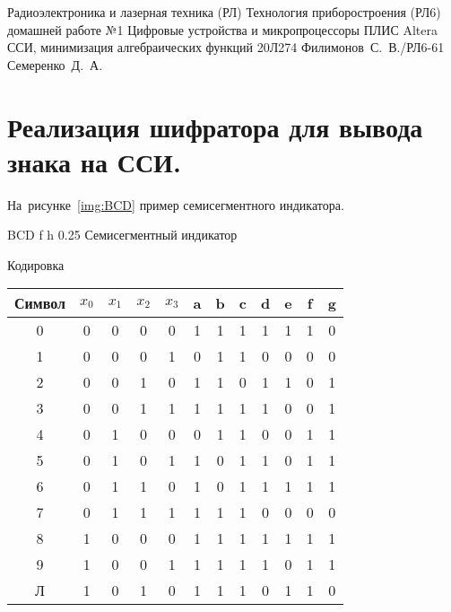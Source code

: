 \documentclass{bmstu}
\begin{document}
	\makereporttitle
	{Радиоэлектроника и лазерная техника (РЛ)} %
	{Технология приборостроения (РЛ6)} %
	{домашней работе №1} %
	{Цифровые устройства и микропроцессоры} %
	{ПЛИС Altera ССИ, минимизация алгебраических функций} %
	{20Л274} %
	{Филимонов~С.~В./РЛ6-61} %
	{Семеренко~Д.~А.} %
	
	\tableofcontents
	\chapter{Реализация шифратора для вывода знака на ССИ.}
	На~рисунке~\ref{img:BCD} пример семисегментного индикатора.
	
	{BCD} %
	{f} %
	{h} %
	{0.25\textwidth} %
	{Семисегментный индикатор} %
	
	Кодировка

	\begin{center}
		\begin{tabular}{ |c||c|c|c|c||c|c|c|c|c|c|c| } 
			\hline
		     Символ & $x_0$ & $x_1$ & $x_2$ & $x_3$ &  a & b & c & d & e & f & g \\
		    \hline
			 0 & 0 & 0 & 0 & 0 & 1 & 1 & 1 & 1 & 1 & 1 & 0 \\ 
			 1 & 0 & 0 & 0 & 1 & 0 & 1 & 1 & 0 & 0 & 0 & 0 \\
			 2 & 0 & 0 & 1 & 0 & 1 & 1 & 0 & 1 & 1 & 0 & 1 \\
			 3 & 0 & 0 & 1 & 1 & 1 & 1 & 1 & 1 & 0 & 0 & 1 \\
			 4 & 0 & 1 & 0 & 0 & 0 & 1 & 1 & 0 & 0 & 1 & 1 \\
			 5 & 0 & 1 & 0 & 1 & 1 & 0 & 1 & 1 & 0 & 1 & 1 \\
			 6 & 0 & 1 & 1 & 0 & 1 & 0 & 1 & 1 & 1 & 1 & 1 \\
			 7 & 0 & 1 & 1 & 1 & 1 & 1 & 1 & 0 & 0 & 0 & 0 \\
			 8 & 1 & 0 & 0 & 0 & 1 & 1 & 1 & 1 & 1 & 1 & 1 \\
			 9 & 1 & 0 & 0 & 1 & 1 & 1 & 1 & 1 & 0 & 1 & 1 \\
			 Л & 1 & 0 & 1 & 0 & 1 & 1 & 1 & 0 & 1 & 1 & 0 \\
			\hline
		\end{tabular}
	\end{center}
	
\end{document}
